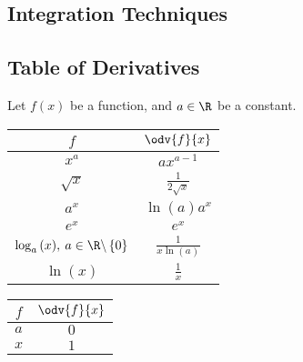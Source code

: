 \documentclass{article}
\begin{document}
\begin{appendix}
    \section{Integration Techniques}
    \subsection{Table of Derivatives}
    Let \(f\left( x \right)\) be a function, and \(a\in\R\) be a
    constant.
    \begin{table}[H]
        \renewcommand*{\arraystretch}{1.5}
        \centering
        \begin{tabular}{c c}
            \toprule
            \(f\)                                                              & \(\odv{f}{x}\)                                   \\
            \midrule
            \(x^a\)                                                            & \(a x^{a-1}\)                                    \\
            \(\sqrt{x}\)                                                       & \(\displaystyle \frac{1}{2\sqrt{x}}\)            \\
            \(a^x\)                                                            & \(\ln{\left(a\right)} a^x\)                      \\
            \(e^x\)                                                            & \(e^x\)                                          \\
            \(\log_a{\left(x\right)}, \: a\in \R\backslash\left\{ 0 \right\}\) & \(\displaystyle \frac{1}{x\ln{\left(a\right)}}\) \\[8pt]
            \(\ln{\left(x\right)}\)                                            & \(\displaystyle \frac{1}{x}\)                    \\[5pt]
            \bottomrule
        \end{tabular}
        \begin{tabular}{c c}
            \toprule
            \(f\)                                                         & \(\odv{f}{x}\)                                                            \\
            \midrule
            \(a\)                                                         & \(0\)                                                                     \\
            \(x\)                                                         & \(1\)                                                                     \\

\end{tabular}
\end{table}
\end{appendix}
\end{document}
